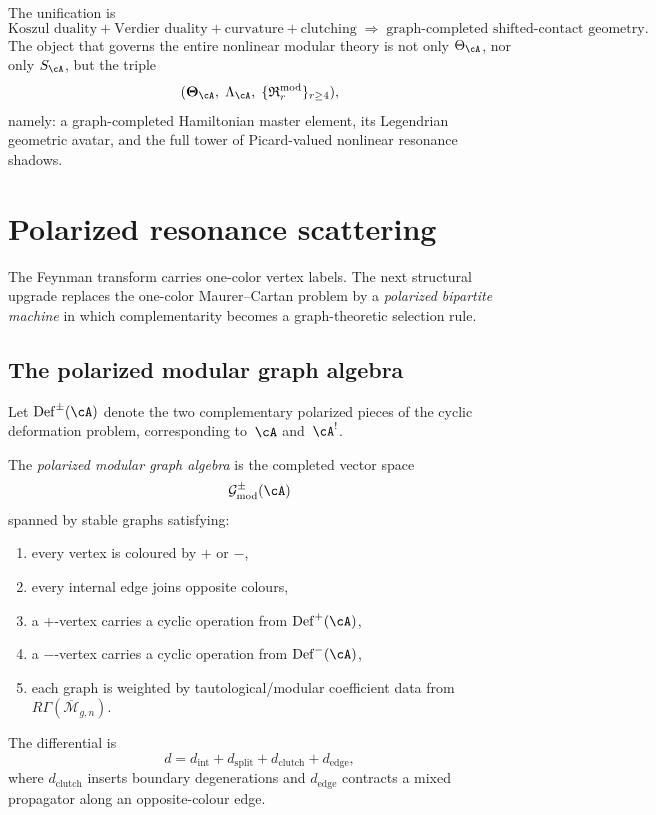 \begin{remark}
\label{rem:nms-conceptual-outcome}
The unification is
\[
\text{Koszul duality} + \text{Verdier duality} + \text{curvature} + \text{clutching}
\;\Longrightarrow\;
\text{graph-completed shifted-contact geometry}.
\]
The object that governs the entire nonlinear modular theory is not only $\Theta_{\cA}$, nor only $S_{\cA}$, but the triple
\[
(\boldsymbol\Theta_{\cA},\;\Lambda_{\cA},\;\{\mathfrak R^{\mathrm{mod}}_{r}\}_{r\ge 4}),
\]
namely: a graph-completed Hamiltonian master element, its Legendrian geometric avatar, and the full tower of Picard-valued nonlinear resonance shadows.
\end{remark}

\section{Polarized resonance scattering}
\label{sec:nms-polarized-scattering-theory}

The Feynman transform carries one-color vertex labels. The next structural upgrade replaces the one-color Maurer--Cartan problem by a \emph{polarized bipartite machine} in which complementarity becomes a graph-theoretic selection rule.

\subsection{The polarized modular graph algebra}
\label{subsec:nms-polarized-graph-algebra}

\begin{definition}
\label{def:nms-polarized-modular-graph-algebra}
%
Let
$\mathrm{Def}^{\pm}(\cA)$
denote the two complementary polarized pieces of the cyclic deformation problem, corresponding to~$\cA$ and~$\cA^!$.

The \emph{polarized modular graph algebra} is the completed vector space
\[
\mathcal G^{\pm}_{\mathrm{mod}}(\cA)
\]
spanned by stable graphs satisfying:
\begin{enumerate}[label=\textup{(\arabic*)}]
\item every vertex is coloured by $+$ or $-$,
\item every internal edge joins opposite colours,
\item a $+$-vertex carries a cyclic operation from $\mathrm{Def}^+(\cA)$,
\item a $-$-vertex carries a cyclic operation from $\mathrm{Def}^-(\cA)$,
\item each graph is weighted by tautological/modular coefficient data from $R\Gamma(\overline{\mathcal M}_{g,n})$.
\end{enumerate}
The differential is
\[
d = d_{\mathrm{int}} + d_{\mathrm{split}} + d_{\mathrm{clutch}} + d_{\mathrm{edge}},
\]
where $d_{\mathrm{clutch}}$ inserts boundary degenerations and $d_{\mathrm{edge}}$ contracts a mixed propagator along an opposite-colour edge.
\end{definition}

